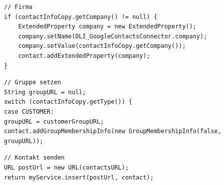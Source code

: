 \begin{lstlisting}	
// Firma
if (contactInfoCopy.getCompany() != null) {
	ExtendedProperty company = new ExtendedProperty();
	company.setName(DLI_GoogleContactsConnector.company);
	company.setValue(contactInfoCopy.getCompany());
	contact.addExtendedProperty(company);
}
\end{lstlisting}

\begin{lstlisting}
// Gruppe setzen
String groupURL = null;
switch (contactInfoCopy.getType()) {
case CUSTOMER:
groupURL = customerGroupURL;
contact.addGroupMembershipInfo(new GroupMembershipInfo(false, groupURL));
\end{lstlisting}

\begin{lstlisting}
// Kontakt senden		
URL postUrl = new URL(contactsURL);
return myService.insert(postUrl, contact);
			
\end{lstlisting}